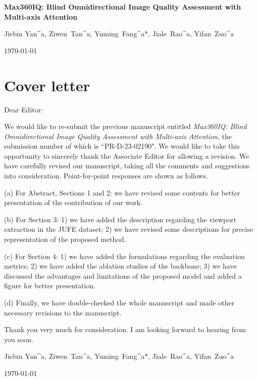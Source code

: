 \documentclass[review, 12pt]{elsarticle}
\def\myauthor{{Jiebin Yan^a}, \rm{Ziwen~Tan}^{a}, {\rm{Yuming}~\rm{Fang}^{a*}}, \rm{Jiale~Rao}^{a}, \rm{Yifan~Zuo}^{a}} %
\def\mytitle{Max360IQ: Blind Omnidirectional Image Quality Assessment with Multi-axis Attention} %
\def\mydate{\today} %
\begin{document}
\begin{titlepage}
  \begin{center}
    {\Large \textbf{\mytitle}}
    \par \vspace{2cm}
    \myauthor
    \par \vspace{13cm}
    \mydate
  \end{center}
\end{titlepage}
\thispagestyle{empty}

\section*{Cover letter}

\begin{tcolorbox}[title = To Editor]
\noindent Dear Editor:
 
\quad We would like to re-submit the previous manuscript entitled \textit{\mytitle}, the submission number of which is ``PR-D-23-02190". We would like to take this opportunity to sincerely thank the Associate Editor for allowing a revision. We have carefully revised our manuscript, taking all the comments and suggestions into consideration. Point-for-point responses are shown as follows.

\quad (a) For Abstract, Sections 1 and 2: we have revised some contents for better presentation of the contribution
of our work.

\quad (b) For Section 3: 1) we have added the description regarding the viewport extraction in the JUFE dataset; 2) we have revised some descriptions for precise representation of the proposed method.

\quad (c) For Section 4: 1) we have added the formulations regarding the evaluation metrics; 2) we have added the ablation studies of the backbone; 3) we have discussed the advantages and limitations of the proposed model and added a figure for better presentation.

\quad (d) Finally, we have double-checked the whole manuscript and made other necessary revisions to the manuscript.



\quad Thank you very much for consideration. I am looking forward to hearing from you soon.

\myauthor

\mydate

\end{tcolorbox}
\end{document}
